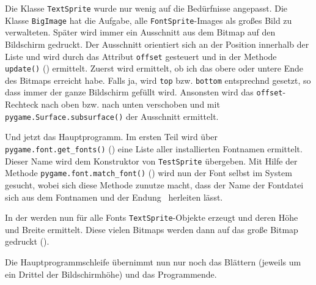 Die Klasse \texttt{TextSprite} wurde nur wenig auf die Bedürfnisse angepasst. Die Klasse \texttt{BigImage} hat  die Aufgabe, alle \texttt{FontSprite}-Images als großes Bild zu verwalteten. Später wird immer ein Ausschnitt aus dem Bitmap auf den Bildschirm gedruckt. Der Ausschnitt orientiert sich an der Position innerhalb der Liste und wird durch das Attribut \texttt{offset} gesteuert und in der Methode \texttt{update()} () ermittelt. Zuerst wird ermittelt, ob ich das obere oder untere Ende des Bitmaps erreicht habe. Falls ja, wird \texttt{top} bzw. \texttt{bottom} entsprechnd gesetzt, so dass immer der ganze Bildschirm gefüllt wird. Ansonsten wird das \texttt{offset}-Rechteck nach oben bzw. nach unten verschoben und mit \texttt{pygame.Surface.subsurface()} der Ausschnitt ermittelt.


Und jetzt das Hauptprogramm. Im ersten Teil wird über \texttt{pygame.font.get\_fonts()} () eine Liste aller installierten Fontnamen ermittelt. Dieser Name wird dem Konstruktor von \texttt{TestSprite} übergeben. Mit Hilfe der Methode \texttt{pygame.font.match\_font()} () wird nun der Font selbst im System gesucht, wobei sich diese Methode zunutze macht, dass der Name der Fontdatei sich aus dem Fontnamen und der Endung~ herleiten lässt.


In der \forSchleife{} werden nun für alle Fonts \texttt{TextSprite}-Objekte erzeugt und deren Höhe und Breite ermittelt. Diese vielen Bitmaps werden dann auf das große Bitmap gedruckt ().


Die Hauptprogrammschleife übernimmt nun nur noch das Blättern (jeweils um ein Drittel der Bildschirmhöhe) und das Programmende.

\newpage
